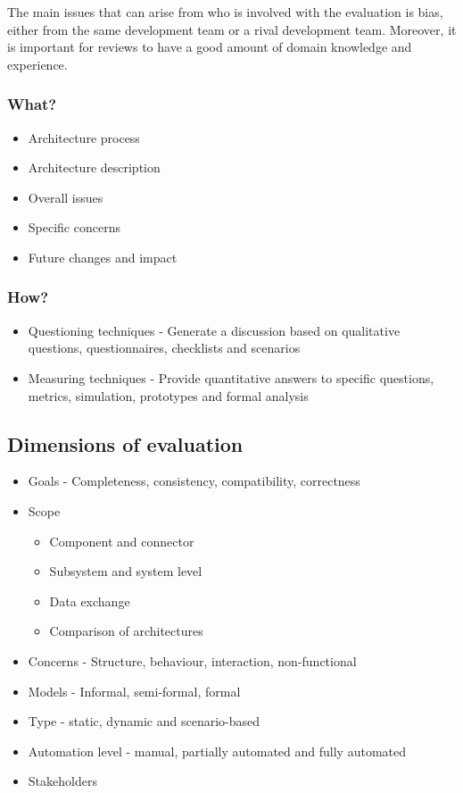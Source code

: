 \documentclass{sty/SizheArticle}
\begin{document}
The main issues that can arise from who is involved with the evaluation
is bias, either from the same development team or a rival
development team. Moreover, it is important for reviews to have a
good amount of domain knowledge and experience.

\subsubsection{What?}
\begin{itemize}
\item Architecture process
\item Architecture description
\item Overall issues
\item Specific concerns
\item Future changes and impact
\end{itemize}

\subsubsection{How?}
\begin{itemize}
\item Questioning techniques - Generate a discussion based on
  qualitative questions, questionnaires, checklists and scenarios
\item Measuring techniques - Provide quantitative answers to
  specific questions, metrics, simulation, prototypes and formal
  analysis
\end{itemize}


\subsection{Dimensions of evaluation}
\begin{itemize}
\item Goals - Completeness, consistency, compatibility,
  correctness
\item Scope
  \begin{itemize}
  \item Component and connector
  \item Subsystem and system level
  \item Data exchange
  \item Comparison of architectures
  \end{itemize}
\item Concerns - Structure, behaviour, interaction,
  non-functional
\item Models - Informal, semi-formal, formal
\item Type - static, dynamic and scenario-based
\item Automation level - manual, partially automated and
  fully automated
\item Stakeholders
\end{itemize}
\end{document}
